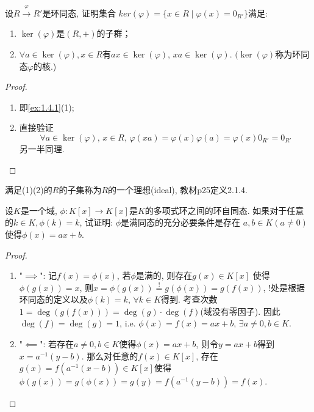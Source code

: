 \begin{problem}
    设$R \overset{\varphi}\to R'$是环同态, 证明集合
$ker(\varphi) = \{x \in R \mid \varphi(x) = 0_{R'}\}$满足: 
\begin{enumerate}[(1)]
    \item $\ker(\varphi)$是$(R, +)$的子群；
    \item $\forall a \in \ker (\varphi), x \in R$有$ax \in \ker(\varphi)$, $xa \in \ker (\varphi)$.
$(\ker(\varphi)$称为环同态$\varphi$的核.)
\end{enumerate}
\end{problem}

\begin{proof}
\begin{enumerate}[(1)]
    \item 即\ref{ex:1.4.1}(1);
    \item 直接验证\[
        \forall a \in \ker(\varphi),\, x \in R,\, \varphi(xa) = \varphi(x)\varphi(a) = \varphi(x)0_{R'} = 0_{R'}
    \]
    另一半同理.
\end{enumerate}
\end{proof}

\begin{remark}
    满足(1)(2)的$R$的子集称为$R$的一个理想(ideal), 教材p25定义2.1.4.
\end{remark}

\begin{problem}
    设$K$是一个域, $\phi:K[x] \to K[x]$是$K$的多项式环之间的环自同态. 
如果对于任意的$k \in K, \phi(k) = k$, 试证明: $\phi$是满同态的充分必要条件是存在
$a, b \in K(a \neq 0)$使得$\phi(x) = ax + b$.
\end{problem}

\begin{proof}
\begin{enumerate}[(1)]
    \item "$\implies$": 记$f(x) = \phi(x)$, 若$\phi$是满的, 则存在$g(x) \in K[x]$
使得$\phi(g(x)) = x$, 则$x = \phi(g(x)) \overset{!}= g(\phi(x)) = g(f(x))$,
!处是根据环同态的定义以及$\phi(k) = k,\, \forall k \in K$得到.
考查次数$1 = \deg(g(f(x))) = \deg(g) \cdot \deg(f)$(域没有零因子). 因此$\deg(f) = \deg(g) = 1$,
i.e. $\phi(x) = f(x) = ax + b,\, \exists a \neq 0, b \in K$.
    \item "$\impliedby$": 若存在$a \neq 0, b \in K$使得$\phi(x) = ax + b$,
则令$y = ax + b$得到$x = a^{-1}(y - b)$. 那么对任意的$f(x) \in K[x]$,
存在$g(x) = f(a^{-1}(x - b)) \in K[x]$使得$\phi(g(x)) = g(\phi(x)) = g(y) = f(a^{-1}(y - b)) = f(x)$.
\end{enumerate}
\end{proof}

